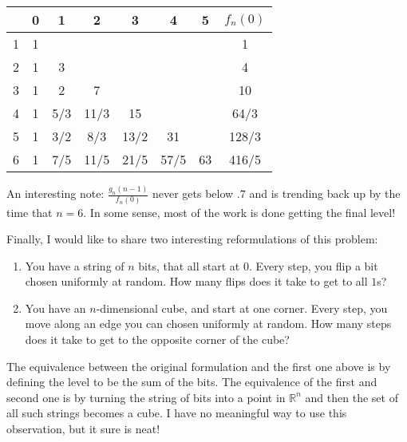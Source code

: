 \documentclass[11pt]{article}
\theoremstyle{definition}
\begin{document}
\begin{tabular}{c||c|c|c|c|c|c||c|}
& 0 & 1 & 2 & 3 & 4 & 5 & $f_n(0)$\\
\hline
\hline
1 & 1 & & & & & & 1\\ \hline
2 & 1 & 3 & & & & & 4\\ \hline
3 & 1 & 2 & 7 & & & & 10\\ \hline
4 & 1 & 5/3 & 11/3 & 15 & & & 64/3 \\ \hline
5 & 1 & 3/2 & 8/3 & 13/2 & 31 & & 128/3\\ \hline
6 & 1 & 7/5 & 11/5 & 21/5 & 57/5 & 63 & 416/5 \\ \hline
\end{tabular}

An interesting note: $\frac{g_n(n-1)}{f_n(0)}$ never gets below $.7$ and is trending back up by the time that $n = 6$.  In some sense, most of the work is done getting the final level!

Finally, I would like to share two interesting reformulations of this problem:
\begin{enumerate}
\item You have a string of $n$ bits, that all start at $0$.  Every step, you flip a bit chosen uniformly at random.  How many flips does it take to get to all $1$s?
\item You have an $n$-dimensional cube, and start at one corner.  Every step, you move along an edge you can chosen uniformly at random.  How many steps does it take to get to the opposite corner of the cube?
\end{enumerate}
The equivalence between the original formulation and the first one above is by defining the level to be the sum of the bits.  The equivalence of the first and second one is by turning the string of bits into a point in $\mathbb{R}^n$ and then the set of all such strings becomes a cube.  I have no meaningful way to use this observation, but it sure is neat!
\end{document}
